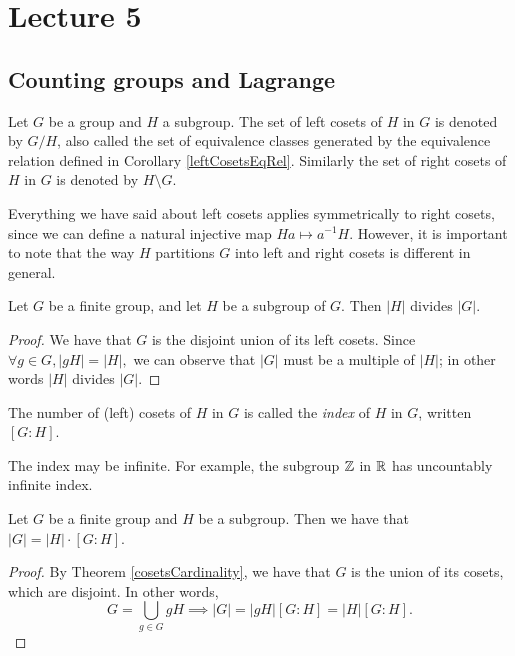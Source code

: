 \section{Lecture 5}
\subsection{Counting groups and Lagrange}
\begin{definition}
  Let $G$ be a group and $H$ a subgroup. The set of left cosets of $H$ in $G$ is denoted
  by $G/H$, also called the set of equivalence classes generated by the equivalence
  relation defined in Corollary \ref{leftCosetsEqRel}. Similarly the set of right cosets of
  $H$ in $G$ is denoted by $H\setminus G$.
  \label{cosets}
\end{definition}
Everything we have said about left cosets applies symmetrically to right cosets, since we can define a natural injective map $Ha\mapsto a^{-1}H$.
However, it is important to note that the way $H$ partitions $G$ into left and right cosets is different in general. 

\begin{theorem}
  Let $G$ be a finite group, and let $H$ be a subgroup of $G$. Then $|H|$ divides $|G|.$
\end{theorem}

\begin{proof}
    We have that $G$ is the disjoint union of its left cosets. Since $\forall g \in G, |gH| = |H|,$ we can observe that $|G|$ must be a multiple of $|H|$; in other words $|H|$ divides $|G|$.
\end{proof}

\begin{definition}
  The number of (left) cosets of $H$ in $G$ is called the \emph{index} of $H$ in $G$, written
  $[G:H]$.
\end{definition}
The index may be infinite. For example, the subgroup $\mathbb Z$ in $\mathbb R$ has uncountably infinite index.

\begin{corollary}
  Let $G$ be a finite group and $H$ be a subgroup. Then we have that $|G|=|H| \cdot [G:H]$.
  \label{lagrange}
\end{corollary}
\begin{proof}
  By Theorem \ref{cosetsCardinality}, we have that $G$ is the union of its cosets, which are
  disjoint. In other words, $$G=\bigcup_{g\in G} gH\implies |G|=|gH|[G:H]=|H|[G:H].$$
\end{proof}

